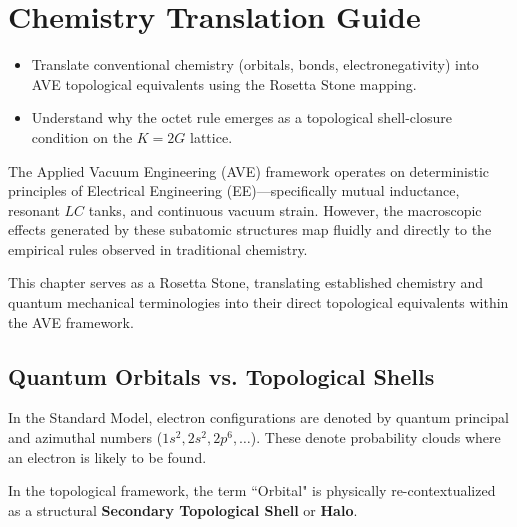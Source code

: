 \chapter{Chemistry Translation Guide}


\begin{objectivebox}
\begin{itemize}
    \item Translate conventional chemistry (orbitals, bonds, electronegativity) into AVE topological equivalents using the Rosetta Stone mapping.
    \item Understand why the octet rule emerges as a topological shell-closure condition on the $K=2G$ lattice.
\end{itemize}
\end{objectivebox}

The Applied Vacuum Engineering (AVE) framework operates on deterministic principles of Electrical Engineering (EE)—specifically mutual inductance, resonant $LC$ tanks, and continuous vacuum strain. However, the macroscopic effects generated by these subatomic structures map fluidly and directly to the empirical rules observed in traditional chemistry.

This chapter serves as a Rosetta Stone, translating established chemistry and quantum mechanical terminologies into their direct topological equivalents within the AVE framework.

\section{Quantum Orbitals vs. Topological Shells}
In the Standard Model, electron configurations are denoted by quantum principal and azimuthal numbers ($1s^2, 2s^2, 2p^6, \dots$). These denote probability clouds where an electron is likely to be found. 

In the topological framework, the term ``Orbital" is physically re-contextualized as a structural \textbf{Secondary Topological Shell} or \textbf{Halo}. 

